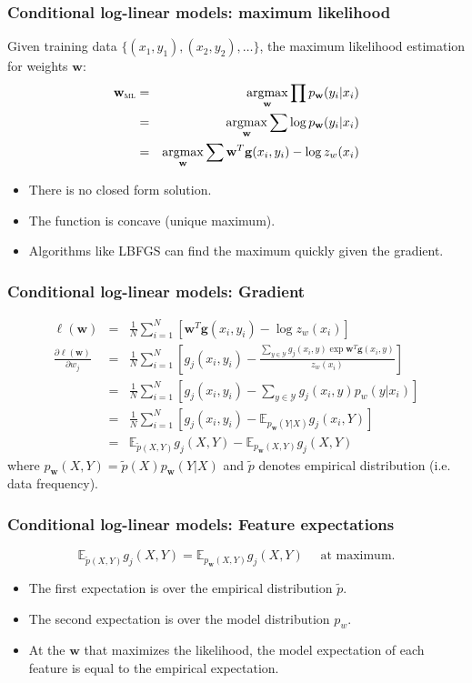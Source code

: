 \documentclass[ignorenonframetext,plain,fleqn]{beamer}
\DeclareMathOperator*{\argmax}{argmax}
\renewcommand{\vec}{\mathbf}
\begin{document}
\begin{frame}\frametitle{Conditional log-linear models: maximum
    likelihood}
Given training data $\{(x_1, y_1), (x_2, y_2), \dots \}$, the
maximum likelihood estimation for weights $\vec{w}$: \begin{eqnarray*}
\vec{w}_\textsc{ml} &=& \argmax_\vec{w} \prod p_\vec{w}(y_i | x_i) \\
&=& \argmax_\vec{w} \sum \log p_\vec{w}(y_i | x_i) \\
&=& \argmax_\vec{w} \sum \vec{w}^T \vec{g}(x_i, y_i) - \log z_w(x_i)
\end{eqnarray*}
\begin{itemize}
\item There is no closed form solution.
\item The function is concave (unique maximum).
\item Algorithms like LBFGS can find the maximum quickly given the
  gradient.
\end{itemize}
\end{frame}

\begin{frame}\frametitle{Conditional log-linear models: Gradient}
\begin{eqnarray*}
\ell(\vec{w}) &=& \frac{1}{N} \sum_{i=1}^N \left[ \vec{w}^T
    \vec{g}(x_i, y_i) - \log z_w(x_i) \right] \\
\frac{\partial \ell(\vec{w})}{\partial w_j} &=& \frac{1}{N}
  \sum_{i=1}^N \left[ g_j(x_i, y_i) - \frac{\sum_{y\in\mathcal{Y}}
      g_j(x_i, y) \exp \vec{w}^T \vec{g}(x_i, y)}{z_w(x_i)}
    \right] \\
&=& \frac{1}{N} \sum_{i=1}^N \left[ g_j(x_i, y_i) -
    \sum_{y\in\mathcal{Y}} g_j(x_i, y) p_w(y|x_i) \right] \\
&=& \frac{1}{N} \sum_{i=1}^N \left[ g_j(x_i, y_i) -
    \mathbb{E}_{p_\vec{w}(Y|X)} g_j(x_i ,Y) \right] \\
&=& \mathbb{E}_{\tilde{p}(X,Y)} g_j(X,Y) -
  \mathbb{E}_{p_\vec{w}(X,Y)} g_j(X,Y)
\end{eqnarray*}
where $p_\vec{w}(X,Y) = \tilde{p}(X)p_\vec{w}(Y|X)$ and
$\tilde{p}$ denotes empirical distribution (i.e. data frequency).
\end{frame}

\begin{frame}\frametitle{Conditional log-linear models: Feature expectations}
\[
\mathbb{E}_{\tilde{p}(X,Y)} g_j(X,Y) =
  \mathbb{E}_{p_\vec{w}(X,Y)} g_j(X,Y)\quad \mbox{ at maximum.}
\]
\begin{itemize}
\item The first expectation is over the empirical distribution
  $\tilde{p}$.
\item The second expectation is over the model distribution $p_w$.
\item At the $\vec{w}$ that maximizes the likelihood, the model
  expectation of each feature is equal to the empirical expectation.
\end{itemize}
\end{frame}
\end{document}
